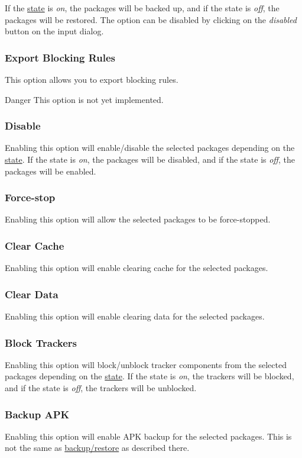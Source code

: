 If the \hyperref[subsubsec:profile-state]{state} is \textit{on}, the packages will be backed up, and if the state is
\textit{off}, the packages will be restored. The option can be disabled by clicking on the \textit{disabled} button on
the input dialog.

\subsubsection{Export Blocking Rules}
This option allows you to export blocking rules.

\begin{danger}{Danger}
    This option is not yet implemented.
\end{danger}

\subsubsection{Disable}
Enabling this option will enable/disable the selected packages depending on the \hyperref[subsubsec:profile-state]{state}.
If the state is \textit{on}, the packages will be disabled, and if the state is \textit{off}, the packages will be enabled.

\subsubsection{Force-stop}
Enabling this option will allow the selected packages to be force-stopped.

\subsubsection{Clear Cache}
Enabling this option will enable clearing cache for the selected packages.

\subsubsection{Clear Data}
Enabling this option will enable clearing data for the selected packages.

\subsubsection{Block Trackers}
Enabling this option will block/unblock tracker components from the selected packages depending on the
\hyperref[subsubsec:profile-state]{state}. If the state is \textit{on}, the trackers will be blocked, and if the state
is \textit{off}, the trackers will be unblocked.

\subsubsection{Backup APK}
Enabling this option will enable APK backup for the selected packages. This is not the same as
\hyperref[sec:backup-restore]{backup/restore} as described there.
